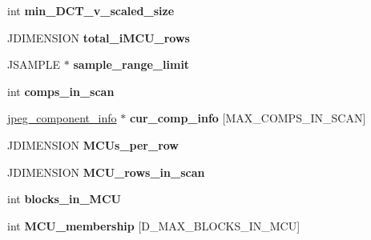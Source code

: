 \begin{DoxyCompactItemize}
\item 
\hypertarget{structjpeg__decompress__struct_a91ac3f0ca9c554b1690a0d18bc351762}{int {\bfseries min\-\_\-\-D\-C\-T\-\_\-v\-\_\-scaled\-\_\-size}}\label{structjpeg__decompress__struct_a91ac3f0ca9c554b1690a0d18bc351762}

\item 
\hypertarget{structjpeg__decompress__struct_ab210038772e2c74c35b6c0a36db9c6a9}{J\-D\-I\-M\-E\-N\-S\-I\-O\-N {\bfseries total\-\_\-i\-M\-C\-U\-\_\-rows}}\label{structjpeg__decompress__struct_ab210038772e2c74c35b6c0a36db9c6a9}

\item 
\hypertarget{structjpeg__decompress__struct_ac5b2ee6d74cd320a9634b7e37b04c8dc}{J\-S\-A\-M\-P\-L\-E $\ast$ {\bfseries sample\-\_\-range\-\_\-limit}}\label{structjpeg__decompress__struct_ac5b2ee6d74cd320a9634b7e37b04c8dc}

\item 
\hypertarget{structjpeg__decompress__struct_a2a28db865b9d49bfa9bc6335abf331c3}{int {\bfseries comps\-\_\-in\-\_\-scan}}\label{structjpeg__decompress__struct_a2a28db865b9d49bfa9bc6335abf331c3}

\item 
\hypertarget{structjpeg__decompress__struct_add1d9f7f0d5ecc6931ceff438e50ec0c}{\hyperlink{structjpeg__component__info}{jpeg\-\_\-component\-\_\-info} $\ast$ {\bfseries cur\-\_\-comp\-\_\-info} \mbox{[}M\-A\-X\-\_\-\-C\-O\-M\-P\-S\-\_\-\-I\-N\-\_\-\-S\-C\-A\-N\mbox{]}}\label{structjpeg__decompress__struct_add1d9f7f0d5ecc6931ceff438e50ec0c}

\item 
\hypertarget{structjpeg__decompress__struct_aafebfaa0046cc8b449ce2401c174697f}{J\-D\-I\-M\-E\-N\-S\-I\-O\-N {\bfseries M\-C\-Us\-\_\-per\-\_\-row}}\label{structjpeg__decompress__struct_aafebfaa0046cc8b449ce2401c174697f}

\item 
\hypertarget{structjpeg__decompress__struct_a6d1110064a4f2fbc46a8831fd148bca6}{J\-D\-I\-M\-E\-N\-S\-I\-O\-N {\bfseries M\-C\-U\-\_\-rows\-\_\-in\-\_\-scan}}\label{structjpeg__decompress__struct_a6d1110064a4f2fbc46a8831fd148bca6}

\item 
\hypertarget{structjpeg__decompress__struct_a76d2872b589796cb8d66428e660e37fb}{int {\bfseries blocks\-\_\-in\-\_\-\-M\-C\-U}}\label{structjpeg__decompress__struct_a76d2872b589796cb8d66428e660e37fb}

\item 
\hypertarget{structjpeg__decompress__struct_ad5030e75bdaa382cc54bdf628cf330b7}{int {\bfseries M\-C\-U\-\_\-membership} \mbox{[}D\-\_\-\-M\-A\-X\-\_\-\-B\-L\-O\-C\-K\-S\-\_\-\-I\-N\-\_\-\-M\-C\-U\mbox{]}}\label{structjpeg__decompress__struct_ad5030e75bdaa382cc54bdf628cf330b7}


\end{DoxyCompactItemize}

